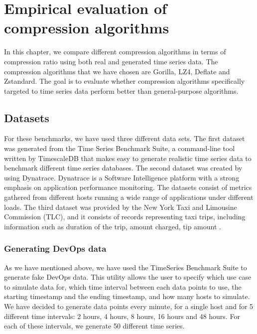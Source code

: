 \chapter{Empirical evaluation of compression algorithms}
In this chapter, we compare different compression algorithms in terms of compression ratio using both real
and generated time series data. The compression algorithms that we have chosen are Gorilla, LZ4,
Deflate and Zstandard. The goal is to evaluate whether compression algorithms specifically
targeted to time series data perform better than general-purpose algorithms.

\section{Datasets}
For these benchmarks, we have used three different data sets. The first dataset was generated from the
Time Series Benchmark Suite, a command-line tool written by TimescaleDB \cite{timescale_2019_timescaletsbs} that makes
easy to generate realistic time series data to benchmark different time series databases.
The second dataset was created by using Dynatrace. Dynatrace is a Software Intelligence platform with a strong
emphasis on application performance monitoring. The datasets consist of metrics gathered from
different hosts running a wide range of applications under different loads.
The third dataset was provided by the New York Taxi and Limousine Commission (TLC), and it consists
of records representing taxi trips, including information such as duration of the trip, amount
charged, tip amount \cite{tlc2019_dataset}.

\subsection{Generating DevOps data}
As we have mentioned above, we have used the TimeSeries Benchmark Suite to generate fake DevOps data.
This utility allows the user to specify which use case to simulate data for, which time interval between each data points
to use, the starting timestamp and the ending timestamp, and how many hosts to simulate.
We have decided to generate data points every minute, for a single host and for 5 different time intervals:
2 hours, 4 hours, 8 hours, 16 hours and 48 hours. For each of these intervals, we generate 50 different time series.

